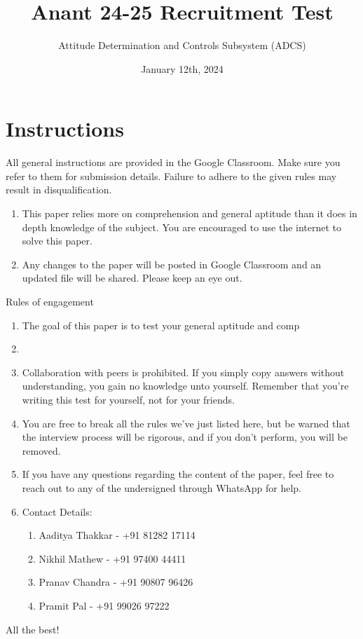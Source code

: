 \documentclass[a4paper, 12pt]{exam}
\begin{document}
	\title{Anant 24-25 Recruitment Test}
	\author{Attitude Determination and Controls Subsystem (ADCS)}
	\date{January 12th, 2024}
	\maketitle
	
	\section*{Instructions}
	All general instructions are provided in the Google Classroom. Make sure you refer to them for submission details. Failure to adhere to the given rules may result in disqualification. 
	\begin{enumerate}[]
		\item This paper relies more on comprehension and general aptitude than it does in depth knowledge of the subject. You are encouraged to use the internet to solve this paper.
		\item Any changes to the paper will be posted in Google Classroom and an updated file will be shared. Please keep an eye out.
	\end{enumerate}
	Rules of engagement
	\begin{enumerate}
		\item The goal of this paper is to test your general aptitude and comp
		\item 
		\item Collaboration with peers is prohibited. If you simply copy answers without understanding, you gain no knowledge unto yourself. Remember that you're writing this test for yourself, not for your friends. 
		\item You are free to break all the rules we've just listed here, but be warned that the interview process will be rigorous, and if you don't perform, you will be removed.
		\item If you have any questions regarding the content of the paper, feel free to reach out to any of the undersigned through WhatsApp for help.
		\item Contact Details:
		\begin{enumerate}
			\item Aaditya Thakkar - +91 81282 17114
			\item Nikhil Mathew - +91 97400 44411
			\item Pranav Chandra - +91 90807 96426
			\item Pramit Pal - +91 99026 97222
		\end{enumerate}
	\end{enumerate}
	\begin{center}
		All the best!
	\end{center}
	
\end{document}

